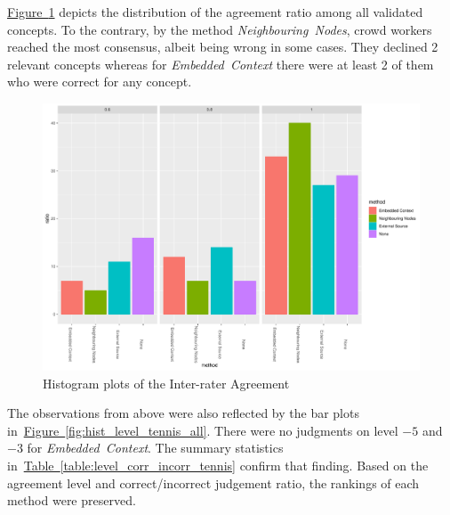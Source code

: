 \hyperref[fig:hist_agreement_tennis_all]{Figure~\ref*{fig:hist_agreement_tennis_all}} depicts the distribution of the agreement ratio among all validated concepts. To the contrary, by the method \emph{Neighbouring~Nodes}, crowd workers reached the most consensus, albeit being wrong in some cases. They declined 2 relevant concepts whereas for \emph{Embedded~Context} there were at least 2 of them who were correct for any concept. 
\begin{figure}
  	 \includegraphics[width=\textwidth]{plots/tennis/hist_agreement}
  	 \caption{Histogram plots of the Inter-rater Agreement}\label{fig:hist_agreement_tennis_all}
\end{figure}

The observations from above were also reflected by the bar plots in~\hyperref[fig:hist_level_tennis_all]{Figure~\ref*{fig:hist_level_tennis_all}}. 
There were no judgments on level $-5$ and $-3$ for \emph{Embedded~Context}.
The summary statistics in~\hyperref[table:level_corr_incorr_tennis]{Table~\ref*{table:level_corr_incorr_tennis}} confirm that finding. Based on the agreement level and correct/incorrect judgement ratio, the rankings of each method were preserved. 
 
